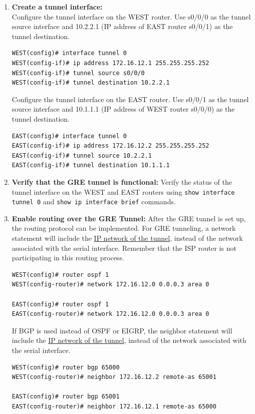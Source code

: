 \begin{enumerate}
\item \textbf{Create a tunnel interface:} \\

Configure the tunnel interface on the WEST router. Use s0/0/0 as the tunnel source interface and 10.2.2.1 (IP address of EAST router s0/0/1) as the tunnel destination.

\begin{verbatim}
WEST(config)# interface tunnel 0
WEST(config-if)# ip address 172.16.12.1 255.255.255.252
WEST(config-if)# tunnel source s0/0/0
WEST(config-if)# tunnel destination 10.2.2.1
\end{verbatim}

Configure the tunnel interface on the EAST router. Use s0/0/1 as the tunnel source interface and 10.1.1.1 (IP address of WEST router s0/0/0) as the tunnel destination.

\begin{verbatim}
EAST(config)# interface tunnel 0
EAST(config-if)# ip address 172.16.12.2 255.255.255.252
EAST(config-if)# tunnel source 10.2.2.1
EAST(config-if)# tunnel destination 10.1.1.1
\end{verbatim}

\item \textbf{Verify that the GRE tunnel is functional:} Verify the status of the tunnel interface on the WEST and EAST routers using \verb|show interface tunnel 0| and \verb|show ip interface brief| commands.

\item \textbf{Enable routing over the GRE Tunnel:} After the GRE tunnel is set up, the routing protocol can be implemented. For GRE tunneling, a network statement will include the \underline{IP network of the tunnel}, instead of the network associated with the serial interface. Remember that the ISP router is not participating in this routing process.

\begin{verbatim}
WEST(config)# router ospf 1
WEST(config-router)# network 172.16.12.0 0.0.0.3 area 0

EAST(config)# router ospf 1
EAST(config-router)# network 172.16.12.0 0.0.0.3 area 0
\end{verbatim}

If BGP is used instead of OSPF or EIGRP, the neighbor statement will include the \underline{IP network of the tunnel}, instead of the network associated with the serial interface.

\begin{verbatim}
WEST(config)# router bgp 65000 
WEST(config-router)# neighbor 172.16.12.2 remote-as 65001

EAST(config)# router bgp 65001
EAST(config-router)# neighbor 172.16.12.1 remote-as 65000
\end{verbatim}

\end{enumerate}

